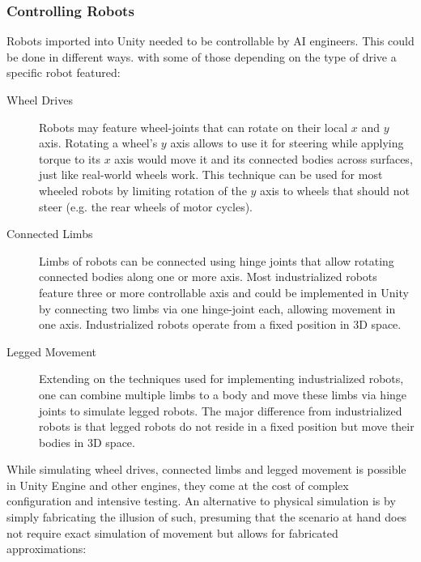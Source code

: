 \subsubsection{Controlling Robots}
Robots imported into Unity needed to be controllable by \ac{AI} engineers. This could be done in different ways. with some of those depending on the type of drive a specific robot featured:
\begin{description}
    \item [Wheel Drives] Robots may feature wheel-joints that can rotate on their local $x$ and $y$ axis. Rotating a wheel's $y$ axis allows to use it for steering while applying torque to its $x$ axis would move it and its connected bodies across surfaces, just like real-world wheels work. This technique can be used for most wheeled robots by limiting rotation of the $y$ axis to wheels that should not steer (e.g. the rear wheels of motor cycles).
    \item [Connected Limbs] Limbs of robots can be connected using hinge joints that allow rotating connected bodies along one or more axis. Most industrialized robots feature three or more controllable axis and could be implemented in Unity by connecting two limbs via one hinge-joint each, allowing movement in one axis. Industrialized robots operate from a fixed position in 3D space.
    \item [Legged Movement] Extending on the techniques used for implementing industrialized robots, one can combine multiple limbs to a body and move these limbs via hinge joints to simulate legged robots. The major difference from industrialized robots is that legged robots do not reside in a fixed position but move their bodies in 3D space.
\end{description}
While simulating wheel drives, connected limbs and legged movement is possible in Unity Engine and other engines, they come at the cost of complex configuration and intensive testing. An alternative to physical simulation is by simply fabricating the illusion of such, presuming that the scenario at hand does not require exact simulation of movement but allows for fabricated approximations:
